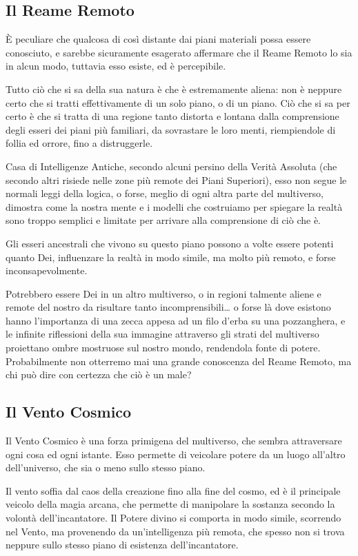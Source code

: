 \subsection{Il Reame Remoto}
È peculiare che qualcosa di così distante dai piani materiali possa essere conosciuto, e sarebbe sicuramente esagerato affermare che il Reame Remoto lo sia in alcun modo, tuttavia esso esiste, ed è percepibile.

Tutto ciò che si sa della sua natura è che è estremamente aliena: non è neppure certo che si tratti effettivamente di un solo piano, o di un piano. Ciò che si sa per certo è che si tratta di una regione tanto distorta e lontana dalla comprensione degli esseri dei piani più familiari, da sovrastare le loro menti, riempiendole di follia ed orrore, fino a distruggerle.

Casa di Intelligenze Antiche, secondo alcuni persino della Verità Assoluta (che secondo altri risiede nelle zone più remote dei Piani Superiori), esso non segue le normali leggi della logica, o forse, meglio di ogni altra parte del multiverso, dimostra come la nostra mente e i modelli che costruiamo per spiegare la realtà sono troppo semplici e limitate per arrivare alla comprensione di ciò che è.

Gli esseri ancestrali che vivono su questo piano possono a volte essere potenti quanto Dei, influenzare la realtà in modo simile, ma molto più remoto, e forse inconsapevolmente.

Potrebbero essere Dei in un altro multiverso, o in regioni talmente aliene e remote del nostro da risultare tanto incomprensibili… o forse là dove esistono hanno l’importanza di una zecca appesa ad un filo d’erba su una pozzanghera, e le infinite riflessioni della sua immagine attraverso gli strati del multiverso proiettano ombre mostruose sul nostro mondo, rendendola fonte di potere.
Probabilmente non otterremo mai una grande conoscenza del Reame Remoto, ma chi può dire con certezza che ciò è un male?

\subsection{Il Vento Cosmico}
Il Vento Cosmico è una forza primigena del multiverso, che sembra attraversare ogni cosa ed ogni istante. Esso permette di veicolare potere da un luogo all’altro dell’universo, che sia o meno sullo stesso piano.

Il vento soffia dal caos della creazione fino alla fine del cosmo, ed è il principale veicolo della magia arcana, che permette di manipolare la sostanza secondo la volontà dell’incantatore. Il Potere divino si comporta in modo simile, scorrendo nel Vento, ma provenendo da un’intelligenza più remota, che spesso non si trova neppure sullo stesso piano di esistenza dell’incantatore.

